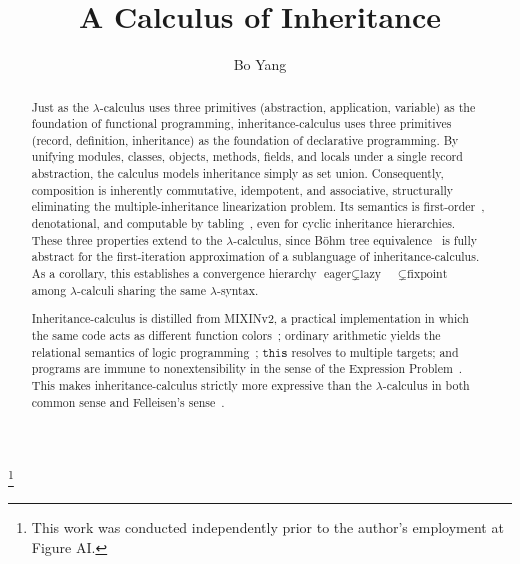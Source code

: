 \title{A Calculus of Inheritance}

\author{Bo Yang}
\thanks{This work was conducted independently prior to the author's employment at Figure AI.}

\begin{abstract}
  Just as the $\lambda$-calculus uses three primitives (abstraction, application, variable) as the foundation of functional programming, inheritance-calculus uses three primitives (record, definition, inheritance) as the foundation of declarative programming. By unifying modules, classes, objects, methods, fields, and locals under a single record abstraction, the calculus models inheritance simply as set union. Consequently, composition is inherently commutative, idempotent, and associative, structurally eliminating the multiple-inheritance linearization problem. Its semantics is first-order~\cite{vanemden1976-predicate-logic-semantics, reynolds1972-definitional-interpreters, aczel1977-inductive-definitions}, denotational, and computable by tabling~\cite{tamaki1986-tabled-resolution}, even for cyclic inheritance hierarchies. These three properties extend to the $\lambda$-calculus, since B\"ohm tree equivalence~\cite{barendregt1984-lambda-calculus} is fully abstract for the first-iteration approximation of a sublanguage of inheritance-calculus. As a corollary, this establishes a convergence hierarchy $\text{eager} \subsetneq \text{lazy}$~\cite{plotkin1975-call-by-name-call-by-value} $\subsetneq \text{fixpoint}$ among $\lambda$-calculi sharing the same $\lambda$-syntax.

  Inheritance-calculus is distilled from MIXINv2, a practical implementation in which the same code acts as different function colors~\cite{nystrom2015-function-color}; ordinary arithmetic yields the relational semantics of logic programming~\cite{vanemden1976-predicate-logic-semantics}; $\mathtt{this}$ resolves to multiple targets; and programs are immune to nonextensibility in the sense of the Expression Problem~\cite{wadler1998-expression-problem}. This makes inheritance-calculus strictly more expressive than the $\lambda$-calculus in both common sense and Felleisen's sense~\cite{felleisen1991-expressive-power}.
\end{abstract}

